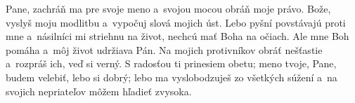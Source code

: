 Pane, zachráň ma pre svoje meno
a~svojou mocou obráň moje právo.
\versseparator
Bože, vyslyš moju modlitbu
a~vypočuj slová mojich úst.
\versseparator
Lebo pyšní povstávajú proti mne
a~násilníci mi striehnu na život,
nechcú mať Boha na očiach.
\versseparator
Ale mne Boh pomáha
a~môj život udržiava Pán.
\versseparator
Na mojich protivníkov obráť nešťastie
a~rozpráš ich, veď si verný.
\versseparator
S radosťou ti prinesiem obetu;
meno tvoje, Pane, budem velebiť, lebo si dobrý;
\versseparator
lebo ma vyslobodzuješ zo všetkých súžení
a~na svojich nepriateľov môžem hľadieť zvysoka.